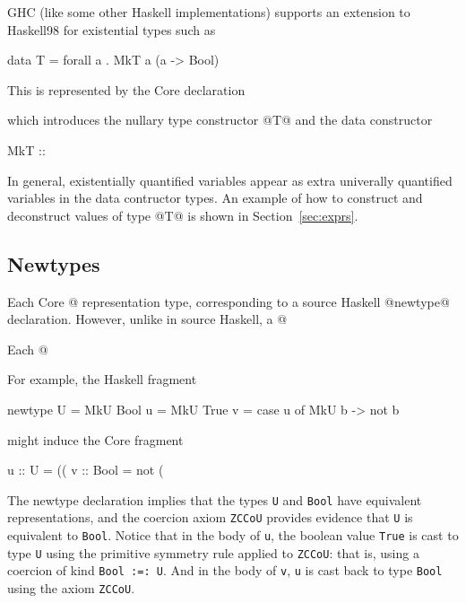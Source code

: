 \documentclass[10pt]{article}
\begin{document}
GHC (like some other Haskell implementations) supports an extension to Haskell98 
for existential types such as 
\begin{code}
data T = forall a . MkT a (a -> Bool)
\end{code}
This is represented by the Core declaration
\begin{code}
\end{code}
which introduces the nullary type constructor @T@ and the data constructor
\begin{code}
MkT :: %
\end{code}
In general, existentially quantified variables appear as extra univerally
quantified variables in the data contructor types.
An example of how to construct and deconstruct values of type @T@ is shown in 
Section~\ref{sec:exprs}.

\subsection{Newtypes}
\label{sec:newtypes}

Each Core @%
representation type, corresponding to a source Haskell @newtype@
declaration. However, unlike in source Haskell, a @%

Each @%

For example, the Haskell fragment
\begin{code}
newtype U = MkU Bool
u = MkU True
v = case u of
  MkU b -> not b
\end{code}
might induce the Core fragment
\begin{code}
u :: U = %
           ((%
v :: Bool = not (%
\end{code}

The newtype declaration implies that the types {\tt U} and {\tt Bool} have equivalent representations, and the coercion axiom {\tt ZCCoU} provides evidence that {\tt U} is equivalent to {\tt Bool}. Notice that in the body of {\tt u}, the boolean value {\tt True} is cast to type {\tt U} using the primitive symmetry rule applied to {\tt ZCCoU}: that is, using a coercion of kind {\tt Bool :=: U}. And in the body of {\tt v}, {\tt u} is cast back to type {\tt Bool} using the axiom {\tt ZCCoU}.
\end{document}
